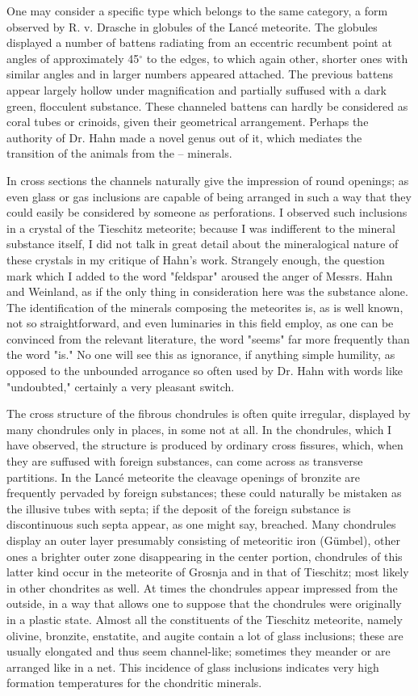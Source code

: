 \documentclass[a4paper, 12pt, oneside]{article}
\begin{document}
One may consider a specific type which belongs to the same category, a form observed by R. v. Drasche in globules of the Lancé meteorite. The globules displayed a number of battens radiating from an eccentric recumbent point at angles of approximately 45$^\circ$ to the edges, to which again other, shorter ones with similar angles and in larger numbers appeared attached. The previous battens appear largely hollow under magnification and partially suffused with a dark green, flocculent substance. These channeled battens can hardly be considered as coral tubes or crinoids, given their geometrical arrangement. Perhaps the authority of Dr. Hahn made a novel genus out of it, which mediates the transition of the animals from the – minerals.

In cross sections the channels naturally give the impression of round openings; as even glass or gas inclusions are capable of being arranged in such a way that they could easily be considered by someone as perforations. I observed such inclusions in a crystal of the Tieschitz meteorite; because I was indifferent to the mineral substance itself, I did not talk in great detail about the mineralogical nature of these crystals in my critique of Hahn's work. Strangely enough, the question mark which I added to the word "feldspar" aroused the anger of Messrs. Hahn and Weinland, as if the only thing in consideration here was the substance alone. The identification of the minerals composing the meteorites is, as is well known, not so straightforward, and even luminaries in this field employ, as one can be convinced from the relevant literature, the word "seems" far more frequently than the word "is." No one will see this as ignorance, if anything simple humility, as opposed to the unbounded arrogance so often used by Dr. Hahn with words like "undoubted," certainly a very pleasant switch.

The cross structure of the fibrous chondrules is often quite irregular, displayed by many chondrules only in places, in some not at all. In the chondrules, which I have observed, the structure is produced by ordinary cross fissures, which, when they are suffused with foreign substances, can come across as transverse partitions. In the Lancé meteorite the cleavage openings of bronzite are frequently pervaded by foreign substances; these could naturally be mistaken as the illusive tubes with septa; if the deposit of the foreign substance is discontinuous such septa appear, as one might say, breached. Many chondrules display an outer layer presumably consisting of meteoritic iron (Gümbel), other ones a brighter outer zone disappearing in the center portion, chondrules of this latter kind occur in the meteorite of Grosnja and in that of Tieschitz; most likely in other chondrites as well. At times the chondrules appear impressed from the outside, in a way that allows one to suppose that the chondrules were originally in a plastic state. Almost all the constituents of the Tieschitz meteorite, namely olivine, bronzite, enstatite, and augite contain a lot of glass inclusions; these are usually elongated and thus seem channel-like; sometimes they meander or are arranged like in a net. This incidence of glass inclusions indicates very high formation temperatures for the chondritic minerals.
\end{document}
